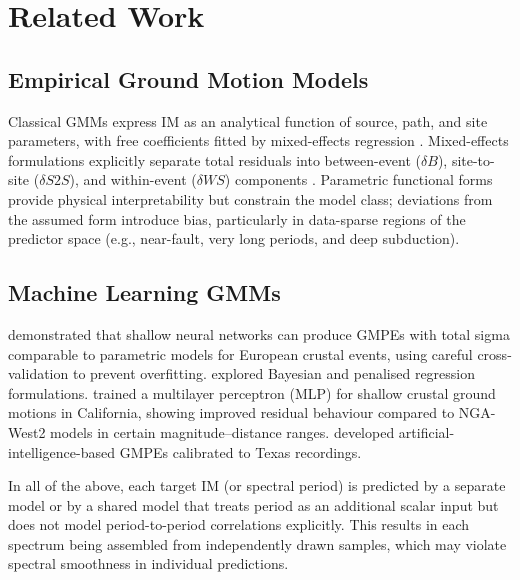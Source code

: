 \documentclass[12pt,a4paper]{article}
\begin{document}
\section{Related Work}
\label{sec:relwork}

\subsection{Empirical Ground Motion Models}

Classical GMMs express IM as an analytical function of source, path, and site
parameters, with free coefficients fitted by mixed-effects regression
\citep{Abrahamson2016,Boore2014,Campbell2014,Chiou2014}.
Mixed-effects formulations explicitly separate total residuals into
between-event ($\delta B$), site-to-site ($\delta S2S$), and within-event
($\delta WS$) components \citep{Al-Atik2010}.
Parametric functional forms provide physical interpretability but constrain
the model class; deviations from the assumed form introduce bias, particularly
in data-sparse regions of the predictor space (e.g., near-fault, very long
periods, and deep subduction).

\subsection{Machine Learning GMMs}

\citet{Derras2014,Derras2016} demonstrated that shallow neural networks
can produce GMPEs with total sigma comparable to parametric models for European
crustal events, using careful cross-validation to prevent overfitting.
\citet{Kuehn2015} explored Bayesian and penalised regression formulations.
\citet{Sahakian2018} trained a multilayer perceptron (MLP) for shallow crustal
ground motions in California, showing improved residual behaviour compared to
NGA-West2 models in certain magnitude--distance ranges.
\citet{Khosravikia2021} developed artificial-intelligence-based GMPEs calibrated
to Texas recordings.

In all of the above, each target IM (or spectral period) is predicted by a
separate model or by a shared model that treats period as an additional scalar
input but does not model period-to-period correlations explicitly.
This results in each spectrum being assembled from independently drawn samples,
which may violate spectral smoothness in individual predictions.
\end{document}

